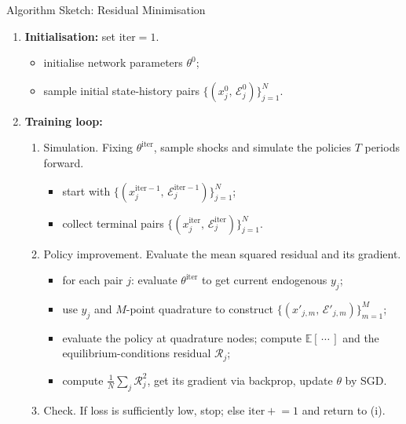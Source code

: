 \documentclass[aspectratio=169,11pt]{beamer}
\newcommand{\emphc}[1]{\textcolor{harvardcrimson}{#1}}
\newcommand{\histE}{\mathcal{E}}  %
\begin{document}
\begin{frame}{Algorithm Sketch: Residual Minimisation}
\small
\begin{enumerate}
\item<1-> \textbf{Initialisation:} set $\text{iter} = 1$.
    \begin{itemize}
    \item<1-> initialise network parameters $\theta^0$;
    \item<1-> sample initial state-history pairs $\bigl\{(x^0_j,\,\histE^0_j)\bigr\}_{j=1}^N$.
    \end{itemize}

\item<2-> \textbf{Training loop:}
    \begin{enumerate}
    \item<2-> \emphc{Simulation.}  Fixing $\theta^{\text{iter}}$, sample shocks and simulate the policies $T$ periods forward.
        \begin{itemize}
        \item<2-> start with $\bigl\{(x^{\text{iter}-1}_j,\,\histE^{\text{iter}-1}_j)\bigr\}_{j=1}^N$;
        \item<2-> collect terminal pairs $\bigl\{(x^{\text{iter}}_j,\,\histE^{\text{iter}}_j)\bigr\}_{j=1}^N$.
        \end{itemize}

    \item<3-> \emphc{Policy improvement.}  Evaluate the mean squared residual and its gradient.
        \begin{itemize}
        \item<3-> for each pair $j$: evaluate $\theta^{\text{iter}}$ to get current endogenous $y_j$;
        \item<4-> use $y_j$ and $M$-point quadrature to construct $\bigl\{(x'_{j,m},\,\histE'_{j,m})\bigr\}_{m=1}^M$;
        \item<5-> evaluate the policy at quadrature nodes; compute $\mathbb{E}[\,\cdots\,]$ and the equilibrium-conditions residual $\mathcal{R}_j$;
        \item<6-> compute $\tfrac{1}{N}\sum_j \mathcal{R}_j^2$, get its gradient via backprop, update $\theta$ by SGD.
        \end{itemize}

    \item<7-> \emphc{Check.}  If loss is sufficiently low, stop; else $\text{iter} \mathrel{+}= 1$ and return to (i).
    \end{enumerate}
\end{enumerate}
\end{frame}
\end{document}
